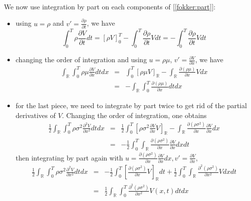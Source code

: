 \documentclass{article}
\begin{document}
\paragraph{} We now use integration by part on each components of [\ref{fokker:part}]:
\begin{itemize}
\item using $u=\rho$ and $v'=\frac{\partial\rho}{\partial t}$, we have
%
\begin{equation}\label{fokker:p1}
\int^T_0\rho\frac{\partial V}{\partial t}dt = \left[\rho V\right]^T_0 - \int^T_0\frac{\partial\rho}{\partial t}V dt = - \int^T_0\frac{\partial\rho}{\partial t}V dt
\end{equation}
%
\item changing the order of integration and using $u=\rho\mu$, $v'=\frac{\partial V}{\partial x}$, we have
%
\begin{eqnarray}\label{fokker:p2}
\int_\mathbb R\int^T_0 \rho\mu\frac{\partial V}{\partial x}dtdx & = & \int^T_0 \left[\rho\mu V\right]_\mathbb R - \int_\mathbb R\frac{\partial(\rho\mu)}{\partial x}V dx\nonumber\\
& = & -\int_\mathbb R\int^T_0\frac{\partial(\rho\mu)}{\partial x}dtdx
\end{eqnarray}
%
\item for the last piece, we need to integrate by part twice to get rid of the partial derivatives of $V$. Changing the order of integration, one obtains
%
\begin{eqnarray}
\frac{1}{2}\int_\mathbb R\int^T_0 \rho\sigma^2\frac{\partial^2 V}{\partial x^2}dtdx & = & \frac{1}{2}\int^T_0 \left[\rho\sigma^2 \frac{\partial V}{\partial x}V\right]_\mathbb R - \int_\mathbb R\frac{\partial(\rho\sigma^2)}{\partial x}\frac{\partial V}{\partial x} dx\nonumber\\
& = & -\frac{1}{2}\int^T_0\int_\mathbb R\frac{\partial (\rho\sigma^2)}{\partial x}\frac{\partial V}{\partial x}dxdt
\end{eqnarray}
%
then integrating by part again with $u=\frac{\partial(\rho\sigma^2)}{\partial x}\frac{\partial V}{\partial x}dx, v'=\frac{\partial V}{\partial x}$, 
%
\begin{eqnarray}\label{fokker:p3}
\frac{1}{2}\int_\mathbb R\int^T_0 \rho\sigma^2\frac{\partial^2 V}{\partial x^2}dtdx & = & -\frac{1}{2}\int^T_0 \left[\frac{\partial(\rho\sigma^2)}{\partial x}V \right]_\mathbb R dt + \frac{1}{2}\int^T_0\int_\mathbb R\frac{\partial ^2(\rho\sigma^2)}{\partial x^2}V dxdt\nonumber\\
& = & \frac{1}{2}\int_\mathbb R\int^T_0\frac{\partial ^2(\rho\sigma^2)}{\partial x^2}V(x, t) dtdx
\end{eqnarray}
%
\end{itemize}
%
\end{document}
